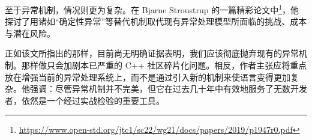 至于异常机制，情况则更为复杂。在 Bjarne Stroustrup 的一篇精彩论文中\footnote{\url{https://www.open-std.org/jtc1/sc22/wg21/docs/papers/2019/p1947r0.pdf}}，他探讨了用诸如“确定性异常”等替代机制取代现有异常处理模型所面临的挑战、成本与潜在风险。

正如该文所指出的那样，目前尚无明确证据表明，我们应该彻底抛弃现有的异常机制。那样做只会加剧本已严重的 C++ 社区碎片化问题。相反，作者主张应将重点放在增强当前的异常处理系统上，而不是通过引入新的机制来使语言变得更加复杂。他强调：尽管异常机制并不完美，但它在过去几十年中有效地服务了无数开发者，依然是一个经过实战检验的重要工具。


























